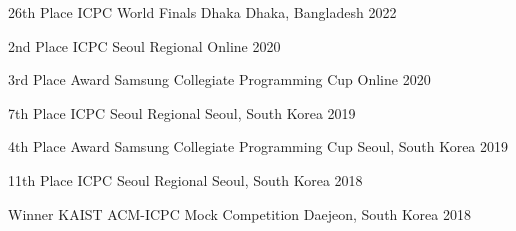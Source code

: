 



\begin{cvhonors}

  \cvhonor
    {26th Place} %
    {ICPC World Finals Dhaka} %
    {Dhaka, Bangladesh} %
    {2022} %

\end{cvhonors}




\begin{cvhonors}

  \cvhonor
    {2nd Place} %
    {ICPC Seoul Regional} %
    {Online} %
    {2020} %

  \cvhonor
    {3rd Place Award} %
    {Samsung Collegiate Programming Cup} %
    {Online} %
    {2020} %

  \cvhonor
    {7th Place} %
    {ICPC Seoul Regional} %
    {Seoul, South Korea} %
    {2019} %
    
  \cvhonor
    {4th Place Award} %
    {Samsung Collegiate Programming Cup} %
    {Seoul, South Korea} %
    {2019} %

  \cvhonor
    {11th Place} %
    {ICPC Seoul Regional} %
    {Seoul, South Korea} %
    {2018} %

  \cvhonor
    {Winner} %
    {KAIST ACM-ICPC Mock Competition} %
    {Daejeon, South Korea} %
    {2018} %

\end{cvhonors}

